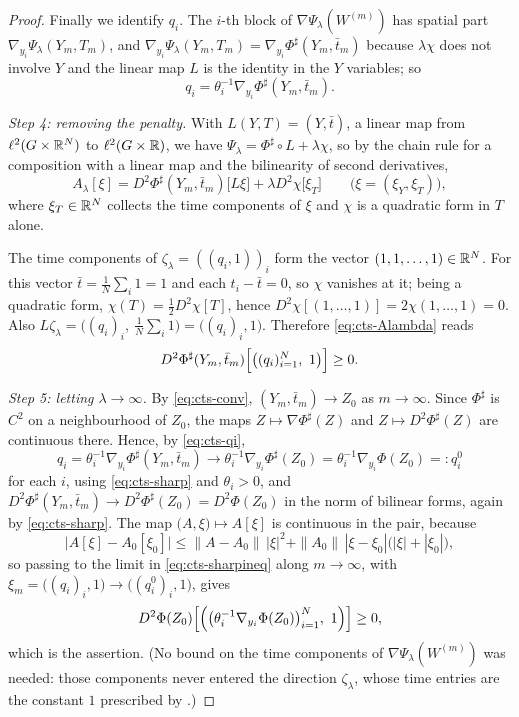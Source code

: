 \begin{proof}
Finally we identify $q_i$. The $i$-th block of $\nabla\Psi_\lambda(W^{(m)})$ has
spatial part $\nabla_{y_i}\Psi_\lambda(Y_m,T_m)$, and
$\nabla_{y_i}\Psi_\lambda(Y_m,T_m)=\nabla_{y_i}\Phi^\sharp(Y_m,\bar t_m)$
because $\lambda\chi$ does not involve $Y$ and the linear map $L$ is the
identity in the $Y$ variables; so
\begin{equation}\label{eq:cts-qi}
  q_i=\theta_i^{-1}\nabla_{y_i}\Phi^\sharp(Y_m,\bar t_m).
\end{equation}

\emph{Step 4: removing the penalty.}
With $L(Y,T)=(Y,\bar t)$, a linear map from $\ell^2(G\times\mathbb{R}^N)$ to
$\ell^2(G\times\mathbb{R})$, we have $\Psi_\lambda=\Phi^\sharp\circ L+\lambda\chi$, so by
the chain rule for a composition with a linear map and the bilinearity of second
derivatives,
\[
  A_\lambda[\xi]=D^2\Phi^\sharp(Y_m,\bar t_m)\bigl[L\xi\bigr]
    +\lambda D^2\chi\bigl[\xi_T\bigr]
  \qquad\bigl(\xi=(\xi_Y,\xi_T)\bigr),
\]
where $\xi_T\in\mathbb{R}^N$ collects the time components of $\xi$ and $\chi$ is a
quadratic form in $T$ alone.

The time components of $\zeta_\lambda=((q_i,1))_i$ form the vector
$(1,1,\dots,1)\in\mathbb{R}^N$. For this vector $\bar t=\tfrac1N\sum_i1=1$ and each
$t_i-\bar t=0$, so $\chi$ vanishes at it; being a quadratic form,
$\chi(T)=\tfrac12 D^2\chi[T]$, hence
$D^2\chi[(1,\dots,1)]=2\chi(1,\dots,1)=0$. Also
$L\zeta_\lambda=\bigl((q_i)_i,\ \tfrac1N\sum_i1\bigr)=\bigl((q_i)_i,1\bigr)$.
Therefore \eqref{eq:cts-Alambda} reads
\begin{equation}\label{eq:cts-sharpineq}
  D^2\Phi^\sharp(Y_m,\bar t_m)
    \Bigl[\bigl((q_i)_{i=1}^N,\ 1\bigr)\Bigr]\ge0 .
\end{equation}

\emph{Step 5: letting $\lambda\to\infty$.}
By \eqref{eq:cts-conv}, $(Y_m,\bar t_m)\to Z_0$ as $m\to\infty$. Since
$\Phi^\sharp$ is $C^2$ on a neighbourhood of $Z_0$, the maps
$Z\mapsto\nabla\Phi^\sharp(Z)$ and $Z\mapsto D^2\Phi^\sharp(Z)$ are continuous
there. Hence, by \eqref{eq:cts-qi},
\[
  q_i=\theta_i^{-1}\nabla_{y_i}\Phi^\sharp(Y_m,\bar t_m)
   \longrightarrow\theta_i^{-1}\nabla_{y_i}\Phi^\sharp(Z_0)
   =\theta_i^{-1}\nabla_{y_i}\Phi(Z_0)=:q_i^0
\]
for each $i$, using \eqref{eq:cts-sharp} and $\theta_i>0$, and
$D^2\Phi^\sharp(Y_m,\bar t_m)\to D^2\Phi^\sharp(Z_0)=D^2\Phi(Z_0)$
in the norm of bilinear forms, again by \eqref{eq:cts-sharp}. The map
$\bigl(A,\xi\bigr)\mapsto A[\xi]$ is continuous in the pair, because
\[
  \bigl|A[\xi]-A_0[\xi_0]\bigr|
   \le\|A-A_0\|\,|\xi|^2+\|A_0\|\,|\xi-\xi_0|\bigl(|\xi|+|\xi_0|\bigr),
\]
so passing to the limit in \eqref{eq:cts-sharpineq} along $m\to\infty$,
with $\xi_m=\bigl((q_i)_i,1\bigr)\to\bigl((q_i^0)_i,1\bigr)$, gives
\[
  D^2\Phi(Z_0)\Bigl[\Bigl(\bigl(\theta_i^{-1}\nabla_{y_i}\Phi(Z_0)\bigr)_{i=1}^N,
    \ 1\Bigr)\Bigr]\ge0 ,
\]
which is the assertion. (No bound on the time components of
$\nabla\Psi_\lambda(W^{(m)})$ was needed: those components never entered the
direction $\zeta_\lambda$, whose time entries are the constant $1$ prescribed by
.)
\end{proof}
